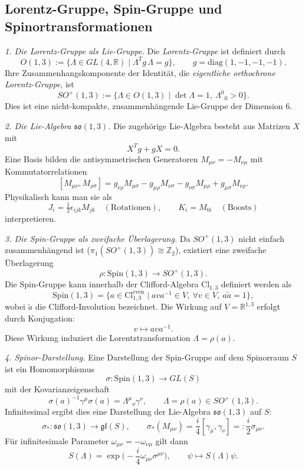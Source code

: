 \documentclass[10pt, letterpaper]{article}
\newcommand{\R}{\mathbb{R}}
\newcommand{\Z}{\mathbb{Z}}
\newcommand{\Cl}{\mathrm{Cl}}
\newcommand{\Spin}{\mathrm{Spin}}
\begin{document}
\pagebreak

\subsection{Lorentz-Gruppe, Spin-Gruppe und Spinortransformationen}

\emph{1. Die Lorentz-Gruppe als Lie-Gruppe.}
Die \emph{Lorentz-Gruppe} ist definiert durch
\[
O(1,3)
:= \{\Lambda \in GL(4,\R)\mid \Lambda^T g\,\Lambda = g\},
\qquad g=\mathrm{diag}(1,-1,-1,-1).
\]
Ihre Zusammenhangskomponente der Identität, die \emph{eigentliche orthochrone Lorentz-Gruppe}, ist
\[
SO^+(1,3)
:= \{\Lambda\in O(1,3)\mid \det\Lambda=1,\ \Lambda^0{}_0>0\}.
\]
Dies ist eine nicht-kompakte, zusammenhängende Lie-Gruppe der Dimension $6$.

\emph{2. Die Lie-Algebra $\mathfrak{so}(1,3)$.}
Die zugehörige Lie-Algebra besteht aus Matrizen $X$ mit
\[
X^T g + g X = 0.
\]
Eine Basis bilden die antisymmetrischen Generatoren $M_{\mu\nu}=-M_{\nu\mu}$ mit Kommutatorrelationen
\[
[M_{\mu\nu}, M_{\rho\sigma}]
= g_{\nu\rho} M_{\mu\sigma} - g_{\mu\rho} M_{\nu\sigma}
 - g_{\nu\sigma} M_{\mu\rho} + g_{\mu\sigma} M_{\nu\rho}.
\]
Physikalisch kann man sie als
\[
J_i = \tfrac12\epsilon_{ijk}M_{jk}\quad (\text{Rotationen}),\qquad
K_i = M_{0i}\quad (\text{Boosts})
\]
interpretieren.

\emph{3. Die Spin-Gruppe als zweifache Überlagerung.}
Da $SO^+(1,3)$ nicht einfach zusammenhängend ist ($\pi_1(SO^+(1,3))\cong \Z_2$), existiert eine zweifache Überlagerung
\[
\rho:\Spin(1,3)\longrightarrow SO^+(1,3).
\]
Die Spin-Gruppe kann innerhalb der Clifford-Algebra $\Cl_{1,3}$ definiert werden als
\[
\Spin(1,3)
=\{a\in \Cl_{1,3}^{\text{even}}\mid a v a^{-1}\in V,\ \forall v\in V,\ a\tilde a=1\},
\]
wobei $\tilde a$ die Clifford-Involution bezeichnet. Die Wirkung auf $V=\R^{1,3}$ erfolgt durch Konjugation:
\[
v\longmapsto a v a^{-1}.
\]
Diese Wirkung induziert die Lorentztransformation $\Lambda=\rho(a)$.

\emph{4. Spinor-Darstellung.}
Eine Darstellung der Spin-Gruppe auf dem Spinorraum $S$ ist ein Homomorphismus
\[
\sigma:\Spin(1,3)\longrightarrow GL(S)
\]
mit der Kovarianzeigenschaft
\[
\sigma(a)^{-1}\gamma^\mu\sigma(a) = \Lambda^\mu{}_\nu \gamma^\nu,
\qquad \Lambda=\rho(a)\in SO^+(1,3).
\]
Infinitesimal ergibt dies eine Darstellung der Lie-Algebra $\mathfrak{so}(1,3)$ auf $S$:
\[
\sigma_*: \mathfrak{so}(1,3)\longrightarrow \mathfrak{gl}(S),\qquad
\sigma_*(M_{\mu\nu}) = \frac{i}{4}[\gamma_\mu,\gamma_\nu]
=: \frac{i}{2}\sigma_{\mu\nu}.
\]
Für infinitesimale Parameter $\omega_{\mu\nu}=-\omega_{\nu\mu}$ gilt dann
\[
S(\Lambda)
=\exp\!\Big(-\frac{i}{4}\omega_{\mu\nu}\sigma^{\mu\nu}\Big),
\qquad
\psi \mapsto S(\Lambda)\psi.
\]
\end{document}

